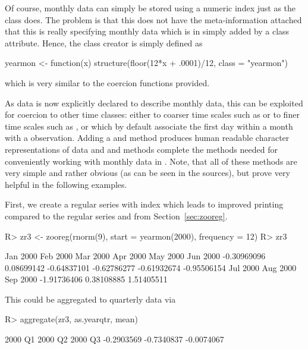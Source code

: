 \documentclass[article,nojss]{jss}
\begin{document}
Of course, monthly data can simply be stored using a numeric index just
as the class  does. The problem is that this does not have the meta-information
attached that this is really specifying monthly data which is in 
simply added by a class attribute. Hence, the class creator is simply defined as

\begin{Scode}
yearmon <- function(x) structure(floor(12*x + .0001)/12, class = "yearmon")
\end{Scode}

which is very similar to the  coercion functions provided.

As  data is now explicitly declared to describe monthly data,
this can be exploited for coercion to other time classes: either to coarser time scales
such as  or to finer time scales such as
,  or  which by default associate the first day
within a month with a  observation. Adding a 
and  method produces human readable character representations
of  data and  and  methods complete the
methods needed for conveniently  working with monthly data in . Note,
that all of these methods are  very simple and rather obvious (as can be seen in
the  sources), but prove very helpful in the following examples.

First, we create a regular series  with  index which
leads to improved printing compared to the regular series  and 
from Section~\ref{sec:zooreg}.

\begin{Schunk}
\begin{Sinput}
R> zr3 <- zooreg(rnorm(9), start = yearmon(2000), frequency = 12)
R> zr3
\end{Sinput}
\begin{Soutput}
   Jan 2000    Feb 2000    Mar 2000    Apr 2000    May 2000    Jun 2000 
-0.30969096  0.08699142 -0.64837101 -0.62786277 -0.61932674 -0.95506154 
   Jul 2000    Aug 2000    Sep 2000 
-1.91736406  0.38108885  1.51405511 
\end{Soutput}
\end{Schunk}

This could be aggregated to quarterly data via

\begin{Schunk}
\begin{Sinput}
R> aggregate(zr3, as.yearqtr, mean)
\end{Sinput}
\begin{Soutput}
   2000 Q1    2000 Q2    2000 Q3 
-0.2903569 -0.7340837 -0.0074067 
\end{Soutput}
\end{Schunk}
\end{document}
